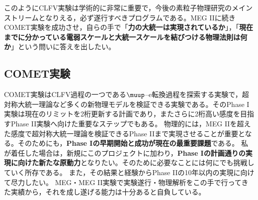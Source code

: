 \documentclass[11pt,a4paper,uplatex,dvipdfmx]{ujarticle} 		%
\newcommand{\研究課題名}{象の卵}
\newcommand{\研究機関名}{東京大学}
\newcommand{\研究代表者氏名}{内山雄祐}
\newcommand{\研究期間の最終元号年度}{6}  %
\renewcommand{\emph}[1]{{\sffamily\bfseries{#1}}}
\begin{document}


このようにCLFV実験は学術的に非常に重要で，今後の素粒子物理研究のメインストリームとなりえる，必ず遂行すべきプログラムである。MEG IIに続きCOMET実験を成功させ，自らの手で「\emph{力の大統一は実現されているか}」，「\emph{現在までに分かっている電弱スケールと大統一スケールを結びつける物理法則は何か}」という問いに答えを出したい。

\subsection{COMET実験}
COMET実験はCLFV過程の一つである$\muup$--e転換過程を探索する実験で，超対称大統一理論など多くの新物理モデルを検証できる実験である。そのPhase I実験は現在のリミットを2桁更新する計画であり，またさらに2桁高い感度を目指すPhase II実験へ向けた重要なステップでもある。
物理的には，MEG IIを超えた感度で超対称大統一理論を検証できるPhase IIまで実現させることが重要となる。そのためにも，\emph{Phase Iの早期開始と成功が現在の最重要課題}である。
私が着任した場合は，新規にこのプロジェクトに加わり，\emph{Phase Iの計画通りの実現に向けた新たな原動力}となりたい。そのために必要なことには何にでも挑戦していく所存である。
また，その結果と経験からPhase IIの10年以内の実現に向けて尽力したい。
MEG・MEG II実験で実験遂行・物理解析をこの手で行ってきた実績から，それを成し遂げる能力は十分あると自負している。
\end{document}
